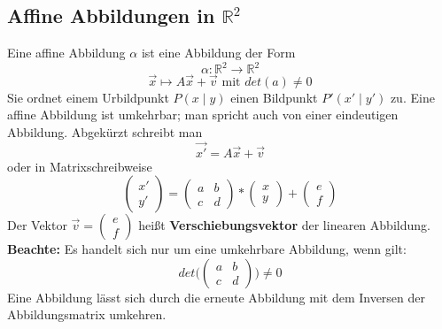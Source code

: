 \documentclass[a4paper,10pt,DIV9, BCOR12mm, oneside,openright,openbib]{scrreprt}
\theoremstyle{definition}
\theoremstyle{plain}
\begin{document}
\subsection{Affine Abbildungen in $\mathbb{R}^2$}\label{subsec:AffA}
Eine affine Abbildung $\alpha$ ist eine Abbildung der Form
\[ \alpha \colon \mathbb{R}^2 \longrightarrow \mathbb{R}^2\]\[\overrightarrow{x} \longmapsto A \overrightarrow{x} + \overrightarrow{v} \text{ mit } det(a) \neq 0 \]
Sie ordnet einem Urbildpunkt $P(x \mid y)$ einen Bildpunkt $P'(x' \mid y')$ zu. Eine affine Abbildung ist umkehrbar; man spricht auch von einer eindeutigen Abbildung. Abgekürzt schreibt man
\[\overrightarrow{x'} = A \overrightarrow{x} + \overrightarrow{v} \]
oder in Matrixschreibweise
\[ \begin{pmatrix} x' \\ y' \end{pmatrix} =  \begin{pmatrix} a & b \\ c & d \end{pmatrix} * \begin{pmatrix} x \\ y \end{pmatrix} +  \begin{pmatrix} e \\ f \end{pmatrix} \]
Der Vektor $\overrightarrow{v} = \begin{pmatrix} e \\ f \end{pmatrix}$ heißt \textbf{Verschiebungsvektor} der linearen Abbildung.\\[5ex]
\textbf{Beachte:} Es handelt sich nur um eine umkehrbare Abbildung, wenn gilt: \[det \Bigg( \begin{pmatrix} a & b \\ c & d \end{pmatrix} \Bigg) \neq 0\]
Eine Abbildung lässt sich durch die erneute Abbildung mit dem Inversen der Abbildungsmatrix umkehren.
\end{document}
